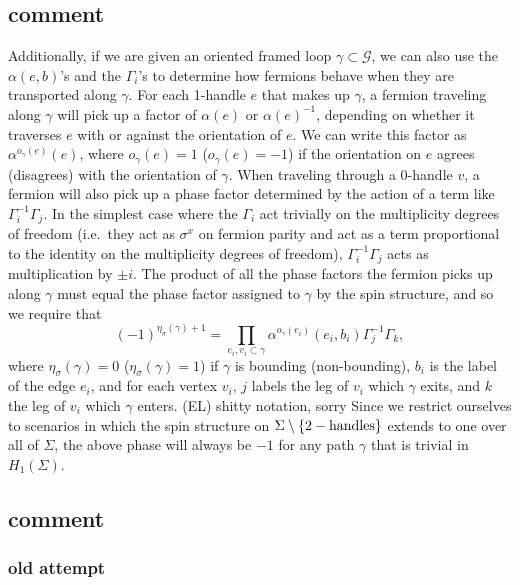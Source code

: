\documentclass[12pt,a4paper]{article}
\newcommand{\mcg}{\mathcal{G}}
\newcommand\be            {\begin{equation}}
\newcommand\ee            {\end{equation}}
\newcommand{\ethan}[1]{{\color{amethyst}\footnotesize{(EL) #1}}}
\begin{document}
\subsection{comment} 
Additionally, if we are given an oriented framed loop $\gamma\subset\mcg$, 
we can also use the $\alpha(e,b)$'s and the $\Gamma_i$'s
to determine how fermions behave when they are transported along $\gamma$. 
For each 1-handle $e$ that makes up $\gamma$, a fermion traveling along $\gamma$ will pick up a factor of $\alpha(e)$
or $\alpha(e)^{-1}$, depending on whether it traverses $e$ with or against the orientation of $e$.
We can write this factor as $\alpha^{o_\gamma(e)}(e)$, where $o_\gamma(e) = 1$ ($o_\gamma(e) = -1$) if the orientation on $e$ agrees (disagrees) with the orientation of $\gamma$. 
When traveling through a 0-handle $v$, a fermion will also pick up a phase factor determined by the action of a term like $\Gamma_i^{-1}\Gamma_j$.
In the simplest case where the $\Gamma_i$ act trivially on the multiplicity degrees of freedom (i.e.\ they act as $\sigma^x$ on fermion parity and act as a term proportional to the identity on the multiplicity degrees of freedom), $\Gamma_i^{-1}\Gamma_j$ acts as multiplication by $\pm i$. 
The product of all the phase factors the fermion picks up along $\gamma$ must equal the phase factor assigned to $\gamma$ by the spin structure, and so we require that 
\be (-1)^{\eta_\sigma(\gamma)+1} = \prod_{e_i,v_i\subset \gamma} \alpha^{o_\gamma(e_i)}(e_i,b_i)\Gamma^{-1}_j\Gamma_k,\ee
where $\eta_\sigma(\gamma) = 0$ ($\eta_\sigma(\gamma) = 1$) if $\gamma$ is bounding (non-bounding), $b_i$ is the label of the edge $e_i$, and for each vertex $v_i$, $j$ labels the leg of $v_i$ which $\gamma$ exits, and $k$ the leg of $v_i$ which $\gamma$ enters. \ethan{shitty notation, sorry}
Since we restrict ourselves to scenarios in which the spin structure on $\Sigma \setminus \{{\rm 2-handles}\}$ extends to one over all of $\Sigma$, the above phase will always be $-1$ for any path $\gamma$ that is trivial in $H_1(\Sigma)$. 
 
 


 
\subsection{comment}
\subsubsection{old attempt}
\end{document}
